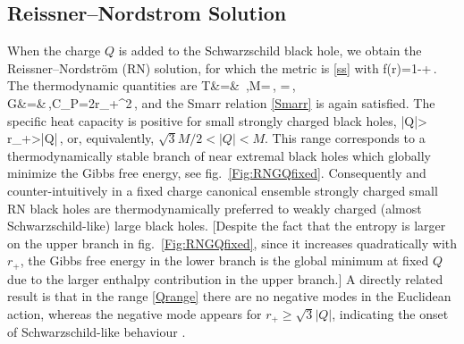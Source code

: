 \subsection{Reissner–Nordstrom Solution} 
When the charge $Q$ is added to the Schwarzschild black hole, we obtain the Reissner--Nordstr\"om (RN) solution, for
which the metric is \eqref{ss} with
\be
f(r)=1-+\,.
\ee
The thermodynamic quantities are
\ba
T&=& \,,\quad M=\,,\quad 
\Phi=\,,\nonumber\\
G&=&\,,\quad C_P=2\pi r_+^2\,,
\ea
and the Smarr relation \eqref{Smarr} is again satisfied.
The specific heat capacity is positive for small strongly charged black holes,
\be\label{Qrange}
|Q|> r_+>|Q|\,,
\ee 
or, equivalently, $\sqrt{3}M/2<|Q|<M$. This range corresponds to a thermodynamically stable branch of near extremal 
black holes which globally minimize the Gibbs free energy, see fig.~\ref{Fig:RNGQfixed}. 
Consequently and counter-intuitively in a fixed charge canonical ensemble
strongly charged small RN black holes are thermodynamically preferred to weakly charged (almost Schwarzschild-like)
large black holes. [Despite the fact that the entropy is larger on the upper branch in fig.~\ref{Fig:RNGQfixed}, since it increases quadratically with $r_+$, the  Gibbs free energy in the lower branch is the global minimum at fixed $Q$ due to the larger enthalpy contribution in the upper branch.] 
A directly related result  is that in the range \eqref{Qrange} there are no negative modes in the Euclidean action, whereas the negative mode appears for $r_+\geq \sqrt{3}|Q|$, indicating the onset of  Schwarzschild-like behaviour  \cite{MonteiroSantos:2009} .
